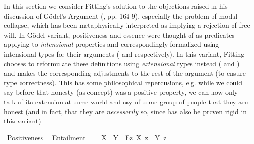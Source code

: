 %
\begin{isabellebody}%
%
%
%
%
%
%
%
%
\isamarkuptrue%
%
\begin{isamarkuptext}%
In this section we consider Fitting's solution to the objections raised in his discussion of G\"odel's Argument (\cite{Fitting}, pp. 164-9), 
especially the problem of modal collapse, which has been metaphysically interpreted as implying a rejection of free will.
In G\"odel variant, positiveness and essence were thought of as predicates applying to \emph{intensional} properties and
correspondingly formalized using intensional types for their arguments (\isa{{\isasymup}{\isasymlangle}{\isasymup}{\isasymlangle}{\isasymzero}{\isasymrangle}{\isasymrangle}} and \isa{{\isasymup}{\isasymlangle}{\isasymup}{\isasymlangle}{\isasymzero}{\isasymrangle}{\isacharcomma}{\isasymzero}{\isasymrangle}} respectively).
In this variant, Fitting chooses to reformulate these definitions using \emph{extensional} types instead (\isa{{\isasymup}{\isasymlangle}{\isasymlangle}{\isasymzero}{\isasymrangle}{\isasymrangle}} and \isa{{\isasymup}{\isasymlangle}{\isasymlangle}{\isasymzero}{\isasymrangle}{\isacharcomma}{\isasymzero}{\isasymrangle}})
and makes the corresponding adjustments to the rest of the argument (to ensure type correctness).
This has some philosophical repercusions, e.g. while we could say before that honesty (as concept) was a
positive property, we can now only talk of its extension at some world and say of some group of people
that they are honest (and in fact, that they are \emph{necessarily} so, since \isa{{\isasymP}} has also be proven rigid in this variant).%
\end{isamarkuptext}\isamarkuptrue%
\isamarkupfalse%
\ Positiveness{\isacharcolon}{\isacharcolon}{\isachardoublequoteopen}{\isasymup}{\isasymlangle}{\isasymlangle}{\isasymzero}{\isasymrangle}{\isasymrangle}{\isachardoublequoteclose}\ {\isacharparenleft}{\isachardoublequoteopen}{\isasymP}{\isachardoublequoteclose}{\isacharparenright}\isanewline
{}\isamarkupfalse%
\ Entailment{\isacharcolon}{\isacharcolon}{\isachardoublequoteopen}{\isasymup}{\isasymlangle}{\isasymlangle}{\isasymzero}{\isasymrangle}{\isacharcomma}{\isasymlangle}{\isasymzero}{\isasymrangle}{\isasymrangle}{\isachardoublequoteclose}\ {\isacharparenleft}\isanewline
\ \ \ {\isachardoublequoteopen}X\ {\isasymRrightarrow}\ Y\ {\isasymequiv}\ \isactrlbold {\isasymbox}{\isacharparenleft}\isactrlbold {\isasymforall}\isactrlsup Ez{\isachardot}\ {\isasymlparr}X\ z{\isasymrparr}\ \isactrlbold {\isasymrightarrow}\ {\isasymlparr}Y\ z{\isasymrparr}{\isacharparenright}{\isachardoublequoteclose}\ \ \isanewline

\end{isabellebody}
